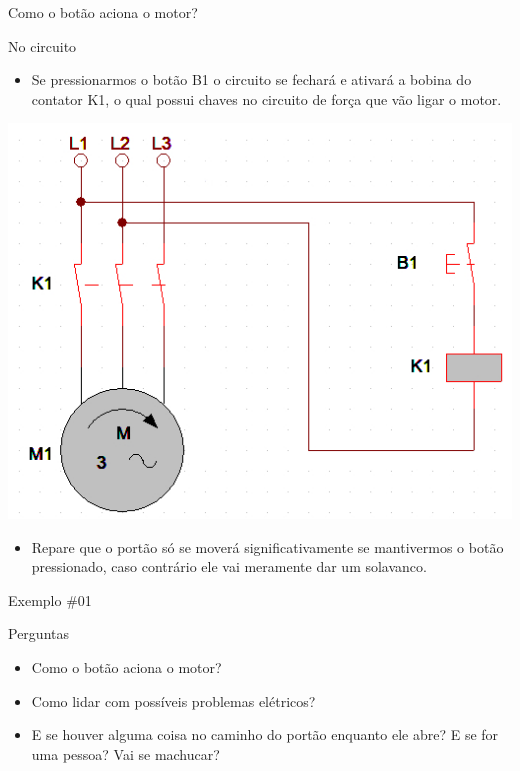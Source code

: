 \begin{frame}{Como o botão aciona o motor?}
\begin{block}{No circuito}
	\begin{itemize}
		\item Se pressionarmos o botão B1 o circuito se fechará e ativará a bobina do contator K1, o qual possui chaves no circuito de força que vão ligar o motor.
	\end{itemize}
\end{block}
\centerline{\includegraphics[width=0.4\linewidth]{Figuras/Ch05/fig8.jpg}}
\begin{block}{}
	\begin{itemize}
		\item Repare que o portão só se moverá significativamente se mantivermos o botão pressionado, caso contrário ele vai meramente dar um solavanco.
	\end{itemize}
\end{block}
\end{frame}

\begin{frame}{Exemplo \#01}
\begin{block}{Perguntas}
	\begin{itemize}
		\item Como o botão aciona o motor? \checkmark
		\item Como lidar com possíveis problemas elétricos?
		\item E se houver alguma coisa no caminho do portão enquanto ele abre? E se for uma pessoa? Vai se machucar?
	\end{itemize}
\end{block}
\end{frame}

